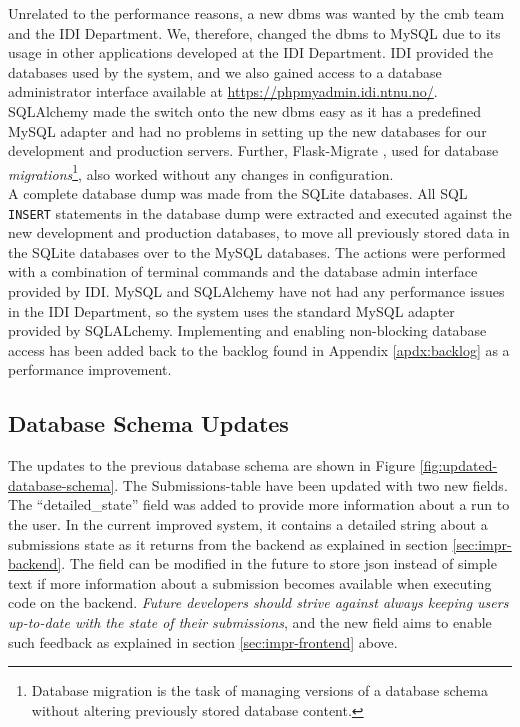 Unrelated to the performance reasons, a new \gls{dbms} was wanted by the \gls{cmb} team and the IDI Department. We, therefore, changed the \gls{dbms} to MySQL due to its usage in other applications developed at the IDI Department. IDI provided the databases used by the system, and we also gained access to a database administrator interface available at \url{https://phpmyadmin.idi.ntnu.no/}. SQLAlchemy made the switch onto the new \gls{dbms} easy as it has a predefined MySQL adapter and had no problems in setting up the new databases for our development and production servers. Further, Flask-Migrate \cite{FLASKMIGRATE}, used for database \textit{migrations}\footnote{Database migration is the task of managing versions of a database schema without altering previously stored database content.}, also worked without any changes in configuration. \\

A complete database dump was made from the SQLite databases. All SQL \texttt{INSERT} statements in the database dump were extracted and executed against the new development and production databases, to move all previously stored data in the SQLite databases over to the MySQL databases. The actions were performed with a combination of terminal commands and the database admin interface provided by IDI. MySQL and SQLAlchemy have not had any performance issues in the IDI Department, so the system uses the standard MySQL adapter provided by SQLALchemy. Implementing and enabling non-blocking database access has been added back to the backlog found in Appendix \ref{apdx:backlog} as a performance improvement.

\subsection{Database Schema Updates}
\label{subsec:impr-database}
The updates to the previous database schema are shown in Figure \ref{fig:updated-database-schema}. The Submissions-table have been updated with two new fields. The ``detailed\_state'' field was added to provide more information about a run to the user. In the current improved system, it contains a detailed string about a submissions state as it returns from the backend as explained in section \ref{sec:impr-backend}. The field can be modified in the future to store \gls{json} instead of simple text if more information about a submission becomes available when executing code on the backend. \textit{Future developers should strive against always keeping users up-to-date with the state of their submissions}, and the new field aims to enable such feedback as explained in section \ref{sec:impr-frontend} above. \\

